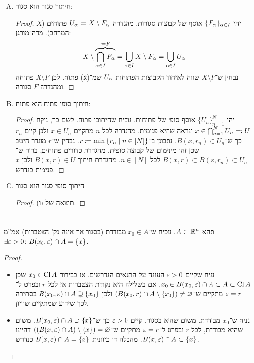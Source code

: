 \documentclass[]{../../../../../tex/classes/homework}
\begin{document}
\begin{enumerate}[(A)]
		\item חיתוך סגור הוא סגור: \begin{proof}
			יהי $\{F_\alpha\}_{\alpha \in I}$ אוסף של קבוצות סגורות. מהגדרה $U_\alpha \coloneqq X \setminus F_\alpha$ פתוחים ($X$ המרחב). מדה־מורגן: 
			\[ X \setminus \overbrace{\bigcap_{\alpha \in I}F_\alpha}^{\coloneqq F} = \bigcup_{\alpha \in I}X \setminus F_\alpha = \bigcup_{\alpha \in I}U_\alpha \]
			נבחין ש־$X \setminus F$ שווה לאיחוד הקבוצות הפתוחות $U_\alpha$ שמ־(א) פתוח. לכן $X \setminus F$ פתוחה ומהגדרה $F$ סגורה. 
		\end{proof}
		\item חיתוך סופי פתוח הוא פתוח: \begin{proof}
			יהי $\{U_n\}_{n = 1}^{N}$ אוסף סופי של פתוחות. נוכיח שחיתוכו פתוח. לשם כך, ניקח $x \in \bigcap_{n = 1}^{N} U_n \eqqcolon U$ ונראה שהיא פנימית. מהגדרה לכל $n$ מתקיים $x \in U_n$ ולכן קיים $r_n$ כך ש־$B(x, r_n) \subset U_n$. נתבונן ב־$r \coloneqq \min\left \{ r_n \mid n \in [N] \right \}$. נבחין ש־$r$ מוגדר היטב שכן זהו מינימום של קבוצה סופית. מהגדרת כדורים פתוחים, ברור ש־$B(x, r) \subset B(x, r_n) \subset U_n$ לכל $n \in [N]$. מהגדרת חיתוך $B(x, r) \in U$ ולכן $x$ פנימית כנדרש. 
		\end{proof}
		\item חיתוך סופי סגור הוא סגור: \begin{proof}
			תוצאה של (ו). 
		\end{proof}
	\end{enumerate}
	
	\section{}
	תהא $A \subset \mathbb{R}^{n}$. נוכיח ש־$x_0 \in A$ מבודדת (בסגור אך אינה נק' הצטברות) אמ''מ $\exists \eg > 0 \co B(x_0, \eg) \cap A = \{x\}$. \begin{proof}
		\begin{itemize}
			\item[$\implies$]נניח שקיים $\eg > 0$  העונה על התנאים הנדרשים. אז בבירור $x_0 \in \operatorname{Cl} A$ שכן $x_0 \in B(x_0, \eg) \cap A \subset A \subset \Cl A$. אם בשלילה היא נקודת הצטברות אז לכל $r$ ובפרט ל־$\eg = r$ מתקיים ש־$(B(x_0, r) \cap A \setminus \{x_0\}) \neq \varnothing$ ולכן $B(x_0, \eg) \cap A \supsetneq \{x_0\}$ בסתירה לכך שידוע שמתקיים שוויון. 
			\item[$\impliedby$]נניח ש־$x_0$ מבודדת. משום שהיא בסגור, קיים $\eg > 0$ כך ש־$B(x_0, \eg) \cap A \supset \{x\}$. משום שהיא מבודדת, לכל $r$ ובפרט ל־$\eg = r$ מתקיים ש־$((B(x, \eg) \cap A) \setminus \{x\}) = \vn$ דהיינו $B(x, \eg) \cap A \subset \{x\}$. מהכלה דו כיוונית  $B(x, \eg) \cap A = \{x\}$ כנדרש. 
		\end{itemize}
	\end{proof}
	
\end{document}
